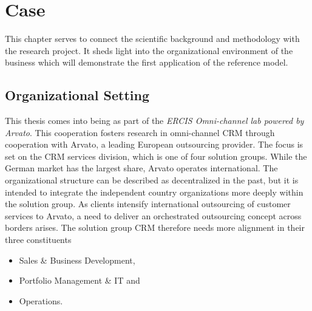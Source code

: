 \chapter{Case}
\label{chap:case}
This chapter serves to connect the scientific background and methodology with the research project. 
It sheds light into the organizational environment of the business which will demonstrate the first application of the reference model. 

\section{Organizational Setting}
This thesis comes into being as part of the \textit{ERCIS Omni-channel lab powered by Arvato}. This cooperation fosters research in omni-channel CRM through cooperation with Arvato, a leading European outsourcing provider. The focus is set on the CRM services division, which is one of four 
solution groups. While the German market has the largest share, Arvato operates international. The organizational structure can be described as decentralized in the past, but it is intended to integrate the independent country organizations more deeply within the solution group. As clients intensify international outsourcing of customer services to Arvato, a need to deliver an orchestrated outsourcing concept across borders arises. The solution group CRM therefore needs more alignment in their three constituents

\begin{itemize}
	\item Sales \& Business Development,
	\item Portfolio Management \& IT and
	\item Operations.
\end{itemize}

